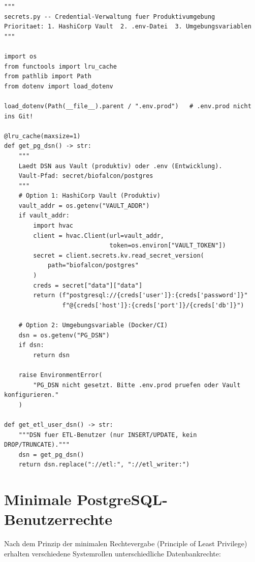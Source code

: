 ﻿\documentclass[12pt,a4paper]{report}
\theoremstyle{definition}
\theoremstyle{remark}
\begin{document}
\begin{lstlisting}[style=python, caption={secrets.py: Sichere Credential-Verwaltung via python-dotenv und Vault}]
"""
secrets.py -- Credential-Verwaltung fuer Produktivumgebung
Prioritaet: 1. HashiCorp Vault  2. .env-Datei  3. Umgebungsvariablen
"""

import os
from functools import lru_cache
from pathlib import Path
from dotenv import load_dotenv

load_dotenv(Path(__file__).parent / ".env.prod")   # .env.prod nicht ins Git!

@lru_cache(maxsize=1)
def get_pg_dsn() -> str:
    """
    Laedt DSN aus Vault (produktiv) oder .env (Entwicklung).
    Vault-Pfad: secret/biofalcon/postgres
    """
    # Option 1: HashiCorp Vault (Produktiv)
    vault_addr = os.getenv("VAULT_ADDR")
    if vault_addr:
        import hvac
        client = hvac.Client(url=vault_addr,
                             token=os.environ["VAULT_TOKEN"])
        secret = client.secrets.kv.read_secret_version(
            path="biofalcon/postgres"
        )
        creds = secret["data"]["data"]
        return (f"postgresql://{creds['user']}:{creds['password']}"
                f"@{creds['host']}:{creds['port']}/{creds['db']}")

    # Option 2: Umgebungsvariable (Docker/CI)
    dsn = os.getenv("PG_DSN")
    if dsn:
        return dsn

    raise EnvironmentError(
        "PG_DSN nicht gesetzt. Bitte .env.prod pruefen oder Vault konfigurieren."
    )

def get_etl_user_dsn() -> str:
    """DSN fuer ETL-Benutzer (nur INSERT/UPDATE, kein DROP/TRUNCATE)."""
    dsn = get_pg_dsn()
    return dsn.replace("://etl:", "://etl_writer:")
\end{lstlisting}

\section{Minimale PostgreSQL-Benutzerrechte}

Nach dem Prinzip der minimalen Rechtevergabe (Principle of Least Privilege)
erhalten verschiedene Systemrollen unterschiedliche Datenbankrechte:
\end{document}
